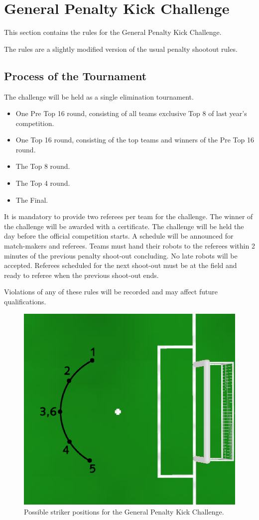 \documentclass[12pt]{article}
\begin{document}
\newpage
\section{General Penalty Kick Challenge}
\label{sec:generalPenaltyKickChallenge}
This section contains the rules for the General Penalty Kick Challenge.

The rules are a slightly modified version of the usual penalty shootout rules.

\subsection{Process of the Tournament}
The challenge will be held as a single elimination tournament.
\begin{itemize}
  \item One Pre Top 16 round, consisting of all teams exclusive Top 8 of last
  year's competition.
  \item One Top 16 round, consisting of the top teams and winners of the Pre
  Top 16 round.
  \item The Top 8 round.
  \item The Top 4 round.
  \item The Final.
\end{itemize}

It is mandatory to provide two referees per team for the challenge.
The winner of the challenge will be awarded with a certificate.
The challenge will be held the day before the official competition starts.
A schedule will be announced for match-makers and referees. Teams must hand their robots to the referees within 2 minutes of the previous penalty shoot-out concluding. No late robots will be accepted. Referees scheduled for the next shoot-out must be at the field and ready to referee when the previous shoot-out ends.

Violations of any of these rules will be recorded and may affect future qualifications. 

\begin{figure}[ht]
  \centerline{\includegraphics[width=0.5\columnwidth]{figs/general_penalty_setup}}
  \caption{Possible striker positions for the General Penalty Kick Challenge.}
  \label{fig:general_penalty_setup}
\end{figure}
\end{document}
